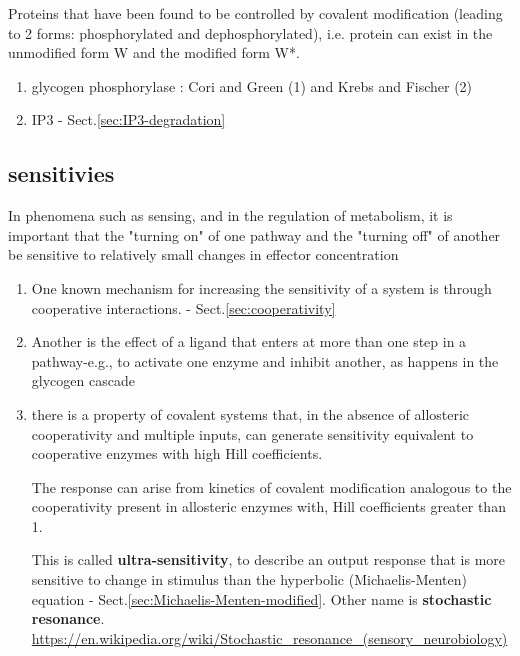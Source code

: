 Proteins that have been found to be controlled by covalent modification
(leading to 2 forms: phosphorylated and dephosphorylated), i.e.
protein can exist in the unmodified form W and the modified
form W*.
\begin{enumerate}
  \item glycogen phosphorylase : Cori and Green (1) and Krebs and
Fischer (2)
  
  \item IP3 - Sect.\ref{sec:IP3-degradation}
\end{enumerate}

\subsection{sensitivies}
\label{sec:sensitivies}

In phenomena such as sensing, and in the regulation of metabolism, it is
important that the "turning on" of one pathway and the "turning off" of another
be sensitive to relatively small changes in effector concentration

\begin{enumerate}
  
  \item  One known mechanism for increasing the sensitivity of a system is
  through cooperative interactions. - Sect.\ref{sec:cooperativity}

  \item Another is the effect of a ligand that enters at more than one step in a
  pathway-e.g., to activate one enzyme and inhibit another, as happens in the glycogen cascade

  \item there is a property of covalent systems that, in the absence of
  allosteric cooperativity and multiple inputs, can generate sensitivity
  equivalent to cooperative enzymes with high Hill coefficients.

The response can arise from kinetics of covalent modification analogous to the
cooperativity present in allosteric enzymes with, Hill coefficients greater than
1.

\label{sec:stochastic-resonance}
This is called {\bf ultra-sensitivity}, to describe
an output response that is more sensitive to change in
stimulus than the hyperbolic (Michaelis-Menten) equation -
Sect.\ref{sec:Michaelis-Menten-modified}.
Other name is {\bf stochastic resonance}.
\url{https://en.wikipedia.org/wiki/Stochastic_resonance_(sensory_neurobiology)}
\end{enumerate}


